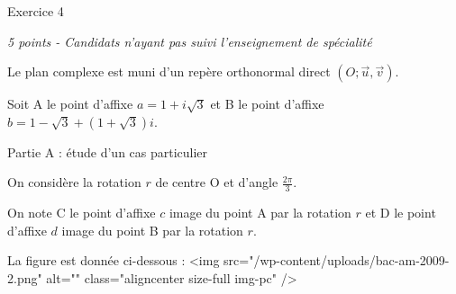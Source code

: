 
%
\begin{h2}Exercice 4\end{h2}
\textit{5 points - Candidats n'ayant pas suivi l'enseignement de spécialité }
\par
Le plan complexe est muni d'un repère orthonormal direct $\left(O; \vec{u}, \vec{v}\right)$.
\par
Soit A le point d'affixe $a=1+i\sqrt{3}$ et B le point d'affixe $b=1-\sqrt{3}+\left(1+\sqrt{3}\right)i$.
\begin{h3}Partie A : étude d'un cas particulier\end{h3}
On considère la rotation $r$ de centre O et d'angle $\frac{2\pi }{3}$.
\par
On note C le point d'affixe $c$ image du point A par la rotation $r$ et D le point d'affixe $d$ image du point B par la rotation $r$.
\par
La figure est donnée ci-dessous :
<img src="/wp-content/uploads/bac-am-2009-2.png" alt="" class="aligncenter size-full  img-pc" />

